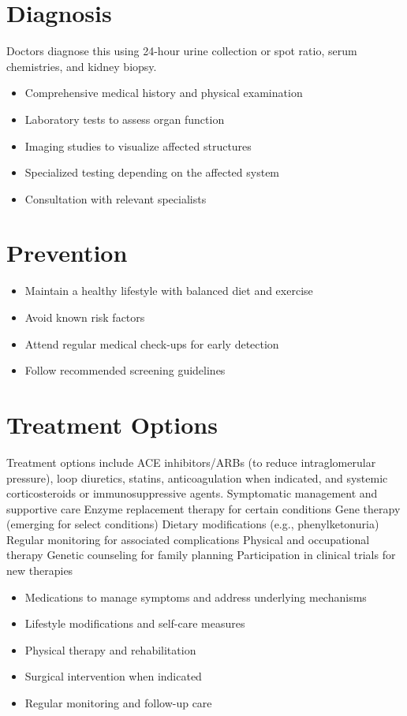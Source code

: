 \section{Diagnosis}
Doctors diagnose this using 24-hour urine collection or spot ratio, serum chemistries, and kidney biopsy.

\begin{itemize}[noitemsep]
  \item Comprehensive medical history and physical examination
  \item Laboratory tests to assess organ function
  \item Imaging studies to visualize affected structures
  \item Specialized testing depending on the affected system
  \item Consultation with relevant specialists
\end{itemize}
\section{Prevention}
\begin{itemize}[noitemsep]
  \item Maintain a healthy lifestyle with balanced diet and exercise
  \item Avoid known risk factors
  \item Attend regular medical check-ups for early detection
  \item Follow recommended screening guidelines
\end{itemize}
\section{Treatment Options}
Treatment options include ACE inhibitors/ARBs (to reduce intraglomerular pressure), loop diuretics, statins, anticoagulation when indicated, and systemic corticosteroids or immunosuppressive agents. Symptomatic management and supportive care Enzyme replacement therapy for certain conditions Gene therapy (emerging for select conditions) Dietary modifications (e.g., phenylketonuria) Regular monitoring for associated complications Physical and occupational therapy Genetic counseling for family planning Participation in clinical trials for new therapies

\begin{itemize}[noitemsep]
  \item Medications to manage symptoms and address underlying mechanisms
  \item Lifestyle modifications and self-care measures
  \item Physical therapy and rehabilitation
  \item Surgical intervention when indicated
  \item Regular monitoring and follow-up care
\end{itemize}
